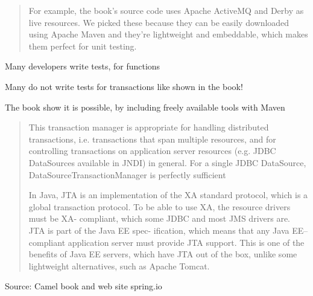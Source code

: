 \documentclass[Screen16to9,17pt]{foils}
\begin{document}

\begin{quote}
  For example, the book’s source
  code uses Apache ActiveMQ and Derby as live resources. We picked these because
  they can be easily downloaded using Apache Maven and they’re lightweight and
  embeddable, which makes them perfect for unit testing.
\end{quote}

\begin{list2}
\item Many developers write tests, for functions
\item Many do not write tests for transactions like shown in the book!
\item The book show it is possible, by including freely available tools with Maven
\end{list2}



\begin{quote}
This transaction manager is appropriate for handling distributed transactions, i.e. transactions that span multiple resources, and for controlling transactions on application server resources (e.g. JDBC DataSources available in JNDI) in general. For a single JDBC DataSource, DataSourceTransactionManager is perfectly sufficient

In Java, JTA is an implementation of the XA standard protocol, which is a global
transaction protocol. To be able to use XA, the resource drivers must be XA-­
compliant, which some JDBC and most JMS drivers are. JTA is part of the Java EE spec-
ification, which means that any Java EE–compliant application server must provide
JTA support. This is one of the benefits of Java EE servers, which have JTA out of the
box, unlike some lightweight alternatives, such as Apache Tomcat.
\end{quote}

Source: Camel book and web site spring.io\\{\footnotesize
{}\\
}



\begin{quote}

\end{quote}
\end{document}
